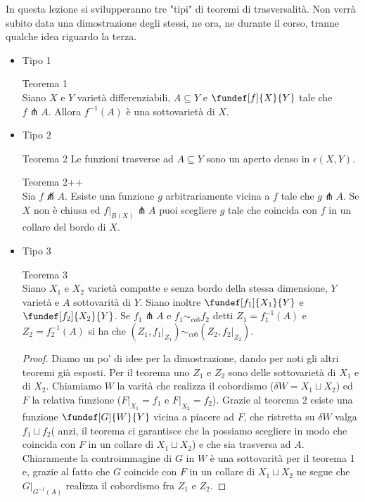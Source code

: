 
In questa lezione si svilupperanno tre "tipi" di teoremi di trasversalità. Non verrà subito data una dimostrazione degli stessi, ne ora, ne durante il corso, tranne qualche idea riguardo la terza.\\
\begin{itemize}
\item Tipo 1 %
\begin{teo} Teorema 1\\
Siano $X$ e $Y$ varietà differenziabili, $A\subseteq Y$ e $\fundef[f]{X}{Y}$  tale che $f\pitchfork A$. Allora $f^{-1}(A)$ è una sottovarietà di $X$.
\end{teo}
\item Tipo 2\\ %
\begin{teo} Teorema 2
Le funzioni trasverse ad $A\subseteq Y$ sono un aperto denso in $\epsilon(X, Y)$. 
\end{teo}
\begin{teo} Teorema 2++\\ %
Sia $f \not\pitchfork A$. Esiste una funzione $g$ arbitrariamente vicina a $f$ tale che $g\pitchfork A$. Se $X$ non è chiusa ed $f|_{B(X)} \pitchfork A$ puoi scegliere $g$ tale che coincida con $f$ in un collare del bordo di $X$. 
\end{teo}
\item Tipo 3 %
\begin{teo} Teorema 3\\
Siano $X_1$ e $X_2$ varietà compatte e senza bordo della stessa dimensione, $Y$ varietà e $A$ sottovarità di $Y$. Siano inoltre $\fundef[f_1]{X_1}{Y}$ e $\fundef[f_2]{X_2}{Y}$. Se $f_1 \pitchfork A$ e $f_1 \sim_{cob} f_2$ detti $Z_1=f_1^{-1}(A)$ e $Z_2=f_2^{-1}(A)$ si ha che $(Z_1, f_1|_{Z_1}) \sim_{cob} (Z_2,f_2|_{Z_2})$. 
\end{teo}
\begin{proof}
 Diamo un po' di idee per la dimostrazione, dando per noti gli altri teoremi già esposti. Per il teorema uno $Z_1$ e $Z_2$ sono delle sottovarietà di $X_1$ e di $X_2$. Chiamiamo $W$ la varità che realizza il cobordismo ($\delta W = X_1 \sqcup X_2$) ed $F$ la relativa funzione ($F|_{X_1} = f_1$ e $F|_{X_2}=f_2$). Grazie al teorema 2 esiste una funzione $\fundef[G]{W}{Y}$ vicina a piacere ad $F$, che ristretta su $\delta W$ valga $f_1\sqcup f_2$( anzi, il teorema ci garantisce che la possiamo scegliere in modo che coincida con $F$ in un collare di $X_1\sqcup X_2$) e che sia trasversa ad $A$. Chiaramente la controimmagine di $G$ in $W$ è una sottovarità per il teorema 1 e, grazie al fatto che $G$ coincide con $F$ in un collare di $X_1 \sqcup X_2$ ne segue che $G|_{G^{-1}(A)}$ realizza il cobordismo fra $Z_1$ e $Z_2$.
 
 \end{proof}
\end{itemize}

